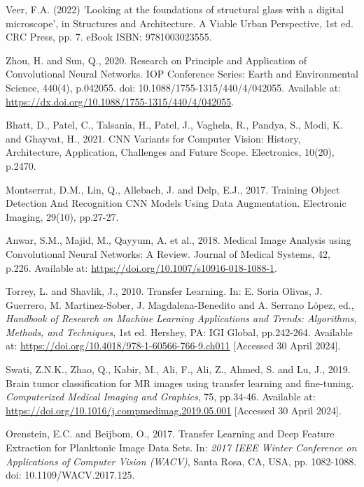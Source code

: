 \begin{thebibliography}{99}
    Veer, F.A. (2022) 'Looking at the foundations of structural glass with a digital microscope', in Structures and Architecture. A Viable Urban Perspective, 1st ed. CRC Press, pp. 7. eBook ISBN: 9781003023555.

    Zhou, H. and Sun, Q., 2020. Research on Principle and Application of Convolutional Neural Networks. IOP Conference Series: Earth and Environmental Science, 440(4), p.042055. doi: 10.1088/1755-1315/440/4/042055. Available at: \url{https://dx.doi.org/10.1088/1755-1315/440/4/042055}.
    
    Bhatt, D., Patel, C., Talsania, H., Patel, J., Vaghela, R., Pandya, S., Modi, K. and Ghayvat, H., 2021. CNN Variants for Computer Vision: History, Architecture, Application, Challenges and Future Scope. Electronics, 10(20), p.2470.

    Montserrat, D.M., Lin, Q., Allebach, J. and Delp, E.J., 2017. Training Object Detection And Recognition CNN Models Using Data Augmentation. Electronic Imaging, 29(10), pp.27-27.

    Anwar, S.M., Majid, M., Qayyum, A. et al., 2018. Medical Image Analysis using Convolutional Neural Networks: A Review. Journal of Medical Systems, 42, p.226. Available at: \url{https://doi.org/10.1007/s10916-018-1088-1}.

    Torrey, L. and Shavlik, J., 2010. Transfer Learning. In: E. Soria Olivas, J. Guerrero, M. Martinez-Sober, J. Magdalena-Benedito and A. Serrano López, ed., \textit{Handbook of Research on Machine Learning Applications and Trends: Algorithms, Methods, and Techniques}, 1st ed. Hershey, PA: IGI Global, pp.242-264. Available at: \url{https://doi.org/10.4018/978-1-60566-766-9.ch011} [Accessed 30 April 2024].

    Swati, Z.N.K., Zhao, Q., Kabir, M., Ali, F., Ali, Z., Ahmed, S. and Lu, J., 2019. Brain tumor classification for MR images using transfer learning and fine-tuning. \textit{Computerized Medical Imaging and Graphics}, 75, pp.34-46. Available at: \url{https://doi.org/10.1016/j.compmedimag.2019.05.001} [Accessed 30 April 2024].

    Orenstein, E.C. and Beijbom, O., 2017. Transfer Learning and Deep Feature Extraction for Planktonic Image Data Sets. In: \textit{2017 IEEE Winter Conference on Applications of Computer Vision (WACV)}, Santa Rosa, CA, USA, pp. 1082-1088. doi: 10.1109/WACV.2017.125.


\end{thebibliography}
